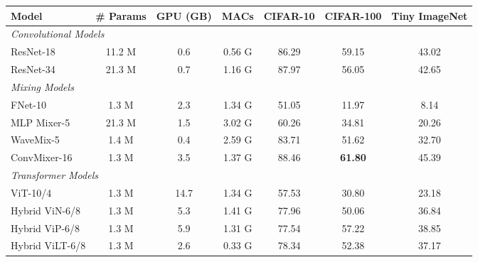 \documentclass{article}
\begin{document}
\begin{table*}[h]
\centering
\begin{tabular}{lcccccc}
\toprule
\multicolumn{1}{l|}{\textbf{Model}} &
  \textbf{\# Params} &
  \textbf{GPU (GB)} &
  \multicolumn{1}{c|}{\textbf{MACs}} &
  \textbf{CIFAR-10} &
  \textbf{CIFAR-100} &
  \textbf{Tiny ImageNet} \\ \midrule
\multicolumn{7}{l}{\textit{Convolutional Models}}                                                                                    \\ \midrule
\multicolumn{1}{l|}{ResNet-18}       & 11.2 M & 0.6          & \multicolumn{1}{c|}{0.56 G} & 86.29 & 59.15          & 43.02          \\
\multicolumn{1}{l|}{ResNet-34}       & 21.3 M & 0.7          & \multicolumn{1}{c|}{1.16 G} & 87.97 & 56.05          & 42.65          \\ \midrule
\multicolumn{7}{l}{\textit{Mixing Models}}                                                                                           \\ \midrule
\multicolumn{1}{l|}{FNet-10}            & 1.3 M  & 2.3          & \multicolumn{1}{c|}{1.34 G} & 51.05 & 11.97          &   8.14             \\
\multicolumn{1}{l|}{MLP Mixer-5}       & 21.3 M & 1.5          & \multicolumn{1}{c|}{3.02 G} & 60.26 & 34.81          & 20.26          \\
\multicolumn{1}{l|}{WaveMix-5}         & 1.4 M  & 0.4 & \multicolumn{1}{c|}{2.59 G} & 83.71 & 51.62          &    32.70          \\
\multicolumn{1}{l|}{ConvMixer-16}       & 1.3 M  & 3.5          & \multicolumn{1}{c|}{1.37 G} & 88.46 & \textbf{61.80} & 45.39          \\ \midrule
\multicolumn{7}{l}{\textit{Transformer Models}}                                                                                      \\ \midrule
\multicolumn{1}{l|}{ViT-10/4}        & 1.3 M  & 14.7         & \multicolumn{1}{c|}{1.34 G} & 57.53 & 30.80           & 23.18          \\
\multicolumn{1}{l|}{Hybrid ViN-6/8}  & 1.3 M  & 5.3          & \multicolumn{1}{c|}{1.41 G} & 77.96 & 50.06          & 36.84          \\
\multicolumn{1}{l|}{Hybrid ViP-6/8}  & 1.3 M  & 5.9          & \multicolumn{1}{c|}{1.31 G} & 77.54 & 57.22          & 38.85               \\
\multicolumn{1}{l|}{Hybrid ViLT-6/8} & 1.3 M  & 2.6          & \multicolumn{1}{c|}{0.33 G} & 78.34 & 52.38          & 37.17          \\

\end{tabular}
\end{table*}
\end{document}
